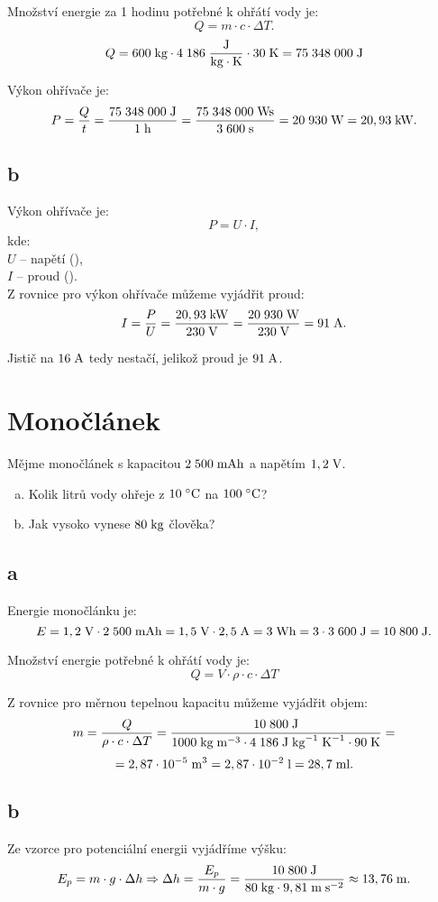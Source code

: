 \documentclass{article}
\begin{document}
Množství energie za 1 hodinu potřebné k ohřátí vody je:
$$
    Q = m \cdot c \cdot \Delta T.
$$
$$
    Q = 600 \; \textrm{kg} \cdot 4 \; 186 \; \frac{\textrm{J}}{\textrm{kg} \cdot \textrm{K}} \cdot 30 \; \textrm{K} = 75 \; 348 \; 000 \; \textrm{J}
$$

Výkon ohřívače je:
$$
    P = \frac{Q}{t} = \frac{75 \; 348 \; 000 \; \textrm{J}}{1 \; \textrm{h}} = \frac{75 \; 348 \; 000 \; \textrm{Ws}}{3 \; 600 \; \textrm{s}} = 20 \; 930 \; \textrm{W} = 20,93 \; \textrm{kW}.
$$


\subsection{b}

Výkon ohřívače je:
$$
    P = U \cdot I,
$$
kde:\\
$U$ -- napětí (\ueqV),\\
$I$ -- proud (\ueqA).\\

Z rovnice pro výkon ohřívače můžeme vyjádřit proud:
$$
    I = \frac{P}{U} = \frac{20,93 \; \textrm{kW}}{230 \; \textrm{V}} = \frac{20 \; 930 \; \textrm{W}}{230 \; \textrm{V}} = 91 \; \textrm{A}.
$$

Jistič na $16 \; \textrm{A}$ tedy nestačí, jelikož proud je $91 \; \textrm{A}$.

\newpage



\section{ Monočlánek \spicy}
Mějme monočlánek s kapacitou $2 \; 500 \; \textrm{mAh}$ a napětím $1,2 \; \textrm{V}$.

\begin{enumerate}[a)]
    \item Kolik litrů vody ohřeje z $10 \; ^\circ \textrm{C}$ na $100 \; ^\circ \textrm{C}$?
    \item Jak vysoko vynese $80 \; \textrm{kg}$ člověka?
\end{enumerate}


\subsection{a}
Energie monočlánku je:
$$
    E = 1,2 \; \textrm{V} \cdot 2 \; 500 \; \textrm{mAh} = 1,5 \; \textrm{V} \cdot 2,5 \; \textrm{A} = 3 \; \textrm{Wh} = 3 \cdot 3 \; 600 \; \textrm{J} = 10 \; 800 \; \textrm{J}.
$$

Množství energie potřebné k ohřátí vody je:
$$
    Q = V \cdot \rho \cdot c \cdot \Delta T
$$

Z rovnice pro měrnou tepelnou kapacitu můžeme vyjádřit objem:
$$
    m = \frac{Q}{\rho \cdot c \cdot \Delta T} = \frac{10 \; 800 \; \textrm{J}}{1 000 \; \textrm{kg} \; \textrm{m}^{-3} \cdot 4 \; 186 \; \textrm{J} \; \textrm{kg}^{-1} \; \textrm{K}^{-1} \cdot 90 \; \textrm{K}} =
$$
$$
    = 2,87 \cdot 10^{-5} \; \textrm{m}^{\textrm{3}} = 2,87 \cdot 10^{-2} \; \textrm{l} = 28,7 \; \textrm{ml}.
$$


\subsection{b}
Ze vzorce pro potenciální energii vyjádříme výšku:
$$
    E_p = m \cdot g \cdot \Delta h \Rightarrow \Delta h = \frac{E_p}{m \cdot g} = \frac{10 \; 800 \; \textrm{J}}{80 \; \textrm{kg} \cdot 9,81 \; \textrm{m} \; \textrm{s}^{-2}} \approx 13,76 \; \textrm{m}.
$$
\end{document}
